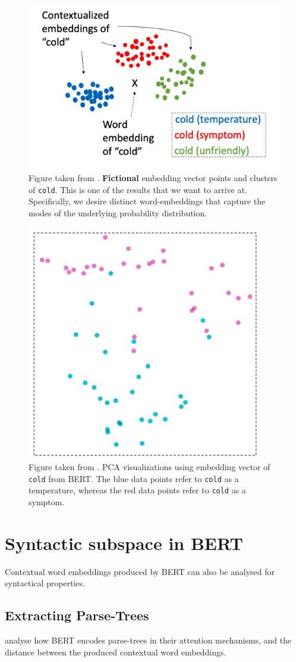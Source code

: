 \documentclass[a4paper,12pt,oneside,openright]{report}
\begin{document}
\begin{figure}
	\center
  \includegraphics[width=0.4\linewidth]{./assets/relatedwork/cold_fictional_desired.png}
  \caption{Figure taken from \cite{si19}. \textbf{Fictional} embedding vector points and clusters of \texttt{cold}. This is one of the results that we want to arrive at.
  Specifically, we desire distinct word-embeddings that capture the modes of the underlying probability distribution. }
  \label{fig:cold_fictional_desired}
\end{figure}

\begin{figure}[H]
	\center
  \includegraphics[width=0.3\linewidth]{./assets/relatedwork/cold_biobert.png}
  \caption{Figure taken from \cite{si19}. PCA visualizations using embedding vector of \texttt{cold} from BERT. The blue data points refer to \texttt{cold} as a temperature, whereas the red data points refer to \texttt{cold} as a symptom.}
  \label{fig:cold_fictional_desired}
\end{figure}


\section{Syntactic subspace in BERT}

Contextual word embeddings produced by BERT can also be analysed for syntactical properties.

\subsection{Extracting Parse-Trees}

\cite{coenen19, jawahar19} analyse how BERT encodes parse-trees in their attention mechanisms, and the distance between the produced contextual word embeddings. \\
\end{document}
